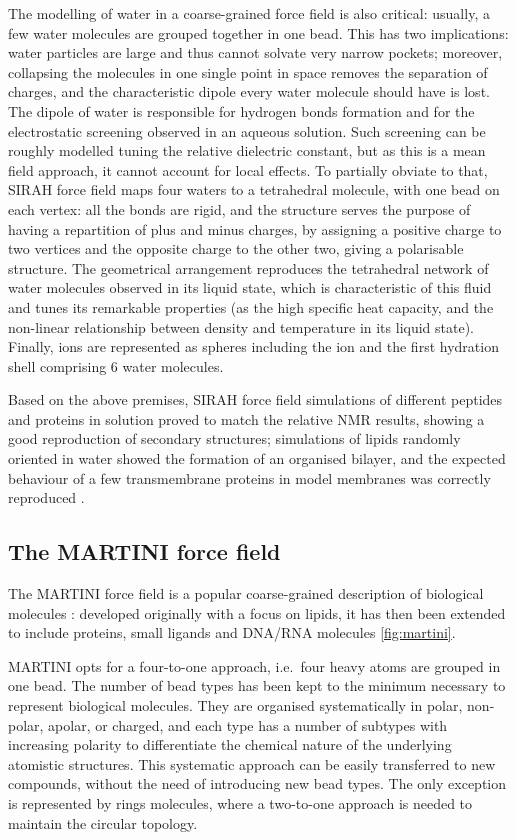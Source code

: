 The modelling of water in a coarse-grained force field is also critical: usually, a few water molecules are grouped together in one bead. This has two implications: water particles are large and thus cannot solvate very narrow pockets; moreover, collapsing the molecules in one single point in space removes the separation of charges, and the characteristic dipole every water molecule should have is lost. The dipole of water is responsible for hydrogen bonds formation and for the electrostatic screening observed in an aqueous solution. Such screening can be roughly modelled tuning the relative dielectric constant, but as this is a mean field approach, it cannot account for local effects.
%
To partially obviate to that, SIRAH force field maps four waters to a tetrahedral molecule, with one bead on each vertex: all the bonds are rigid, and the structure serves the purpose of having a repartition of plus and minus charges, by assigning a positive charge to two vertices and the opposite charge to the other two, giving a polarisable structure. The geometrical arrangement reproduces the tetrahedral network of water molecules observed in its liquid state, which is characteristic of this fluid and tunes its remarkable properties (as the high specific heat capacity, and the non-linear relationship between density and temperature in its liquid state). Finally, ions are represented as spheres including the ion and the first hydration shell comprising 6 water molecules.

Based on the above premises, SIRAH force field simulations of different peptides and proteins in solution proved to match the relative NMR results, showing a good reproduction of secondary structures; simulations of lipids randomly oriented in water showed the formation of an organised bilayer, and the expected behaviour of a few transmembrane proteins in model membranes was correctly reproduced \citep{Machado2018,Barrera2019}.

 
\subsection{The MARTINI force field}

The MARTINI force field is a popular coarse-grained description of biological molecules \citep{Marrink2007,Monticelli2008,DeJong2013}: developed originally with a focus on lipids, it has then been extended to include proteins, small ligands and DNA/RNA molecules \ref{fig:martini}.

MARTINI opts for a four-to-one approach, i.e.\ four heavy atoms are grouped in one bead. The number of bead types has been kept to the minimum necessary to represent biological molecules. They are organised systematically in polar, non-polar, apolar, or charged, and each type has a number of subtypes with increasing polarity to differentiate the chemical nature of the underlying atomistic structures.
%
This systematic approach can be easily transferred to new compounds, without the need of introducing new bead types.
%
The only exception is represented by rings molecules, where a two-to-one approach is needed to maintain the circular topology.


